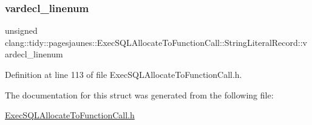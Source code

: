 \subsubsection{\texorpdfstring{vardecl\+\_\+linenum}{vardecl\_linenum}}
{\footnotesize\ttfamily unsigned clang\+::tidy\+::pagesjaunes\+::\+Exec\+S\+Q\+L\+Allocate\+To\+Function\+Call\+::\+String\+Literal\+Record\+::vardecl\+\_\+linenum}



Definition at line 113 of file Exec\+S\+Q\+L\+Allocate\+To\+Function\+Call.\+h.



The documentation for this struct was generated from the following file\+:\begin{DoxyCompactItemize}
\item 
\hyperlink{_exec_s_q_l_allocate_to_function_call_8h}{Exec\+S\+Q\+L\+Allocate\+To\+Function\+Call.\+h}\end{DoxyCompactItemize}
